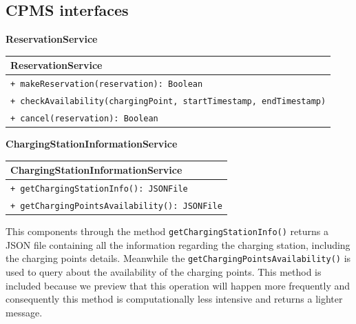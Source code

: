\subsection{CPMS interfaces}
\textbf{ReservationService}\\
\begin{table}[H]
    \centering
    \begin{tabular}{|l|}
        \hline
        \textbf{ReservationService} \\
        \hline
        \verb|+ makeReservation(reservation): Boolean|\\
        \verb|+ checkAvailability(chargingPoint, startTimestamp, endTimestamp)|\\
        \verb|+ cancel(reservation): Boolean|\\
        \hline
    \end{tabular}
\end{table}

\textbf{ChargingStationInformationService}\\
\begin{table}[H]
    \centering
    \begin{tabular}{|l|}
        \hline
        \textbf{ChargingStationInformationService} \\
        \hline
        \verb|+ getChargingStationInfo(): JSONFile|\\
        \verb|+ getChargingPointsAvailability(): JSONFile|\\
        \hline
    \end{tabular}
\end{table}
This components through the method \verb|getChargingStationInfo()| returns a JSON file containing all the information regarding the charging station, including the charging points details. Meanwhile the \verb|getChargingPointsAvailability()| is used to query about the availability of the charging points. This method is included because we preview that this operation will happen more frequently and consequently this method is computationally less intensive and returns a lighter message.\\
